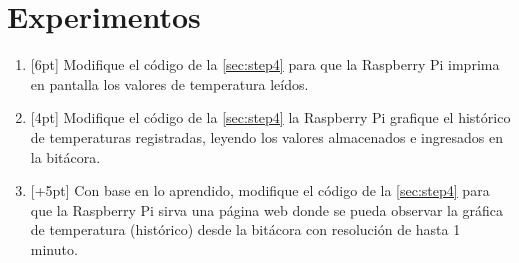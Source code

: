 %
%



\section{Experimentos}%
\label{sec:experiments}

\begin{enumerate}
	\item{} [6pt] Modifique el código de la \cref{sec:step4} para que la Raspberry Pi imprima en pantalla los valores de temperatura leídos.
	\item{} [4pt] Modifique el código de la \cref{sec:step4} la Raspberry Pi grafique el histórico de temperaturas registradas, leyendo los valores almacenados e ingresados en la bitácora.
	\item{} [+5pt] Con base en lo aprendido, modifique el código de la \cref{sec:step4} para que la Raspberry Pi sirva una página web donde se pueda observar la gráfica de temperatura (histórico) desde la bitácora con resolución de hasta 1 minuto.
\end{enumerate}
